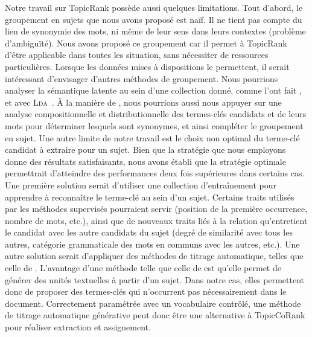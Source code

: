     Notre travail sur TopicRank possède aussi quelques limitations. Tout
    d'abord, le groupement en sujets que nous avons proposé est naïf. Il ne
    tient pas compte du lien de synonymie des mots, ni même de leur sens dans
    leurs contextes (problème d'ambiguïté). Nous avons proposé ce groupement car
    il permet à TopicRank d'être applicable dans toutes les situation, sans
    nécessiter de ressources particulières. Lorsque les données mises à
    dispositions le permettent, il serait intéressant d'envisager d'autres
    méthodes de groupement. Nous pourrions analyser la sémantique latente au
    sein d'une collection donné, comme l'ont fait
    , 
    et  avec
    \textsc{Lda}~\cite{blei2003lda}. À la manière de
    , nous pourrions aussi nous appuyer sur
    une analyse compositionnelle et distributionnelle des termes-clés candidats
    et de leurs mots pour déterminer lesquels sont synonymes, et ainsi compléter
    le groupement en sujet. Une autre limite de notre travail est le choix non
    optimal du terme-clé candidat à extraire pour un sujet. Bien que la
    stratégie que nous employons donne des résultats satisfaisants, nous avons
    établi que la stratégie optimale permettrait d'atteindre des performances
    deux fois supérieures dans certains cas. Une première solution serait
    d'utiliser une collection d'entraînement pour apprendre à reconnaître le
    terme-clé au sein d'un sujet. Certains traits utilisés par les méthodes
    supervisés pourraient servir (position de la première occurrence, nombre de
    mots, etc.), ainsi que de nouveaux traits liés à la relation qu'entretient
    le candidat avec les autre candidats du sujet (degré de similarité avec tous
    les autres, catégorie grammaticale des mots en communs avec les autres,
    etc.). Une autre solution serait d'appliquer des méthodes de titrage
    automatique, telles que celle de . L'avantage
    d'une méthode telle que celle de  est qu'elle
    permet de générer des unités textuelles à partir d'un sujet. Dans notre cas,
    elles permettent donc de proposer des termes-clés qui n'occurrent pas
    nécessairement dans le document. Correctement paramétrée avec un vocabulaire
    contrôlé, une méthode de titrage automatique générative peut donc être une
    alternative à TopicCoRank pour réaliser extraction et assignement.

